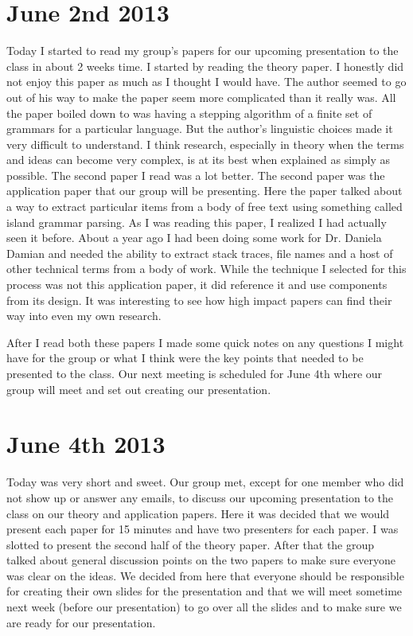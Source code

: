 \documentclass[conference]{IEEEtran}
\begin{document}
\section{June 2nd 2013}
Today I started to read my group's papers for our upcoming presentation to the
class in about 2 weeks time. I started by reading the theory paper. I honestly
did not enjoy this paper as much as I thought I would have. The author seemed to
go out of his way to make the paper seem more complicated than it really was. All the
paper boiled down to was having a stepping algorithm of a finite set of grammars 
for a particular language. But the author's linguistic choices made it very difficult
to understand. I think research, especially in theory when the terms and ideas can
become very complex, is at its best when explained as simply as possible. The second
paper I read was a lot better. The second paper was the application paper that our group
will be presenting. Here the paper talked about a way to extract particular items from
a body of free text using something called island grammar parsing. As I was reading this
paper, I realized I had actually seen it before. About a year ago I had been doing some
work for Dr. Daniela Damian and needed the ability to extract stack traces, file names
and a host of other technical terms from a body of work. While the technique I selected
for this process was not this application paper, it did reference it and use components
from its design. It was interesting to see how high impact papers can find their way into
even my own research.

After I read both these papers I made some quick notes on any questions I might
have for the group or what I think were the key points that needed to be presented to
the class. Our next meeting is scheduled for June 4th where our group will meet and
set out creating our presentation.

\section{June 4th 2013}
Today was very short and sweet. Our group met, except for one member who did not 
show up or answer any emails, to discuss our upcoming presentation to the class on
our theory and application papers. Here it was decided that we would present each paper
for 15 minutes and have two presenters for each paper. I was slotted to present
the second half of the theory paper. After that the group talked about general discussion
points on the two papers to make sure everyone was clear on the ideas. We decided from here
that everyone should be responsible for creating their own slides for the presentation and
that we will meet sometime next week (before our presentation) to go over all the slides
and to make sure we are ready for our presentation.
\end{document}

